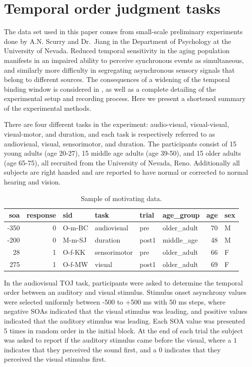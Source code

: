\documentclass[11pt, oneside, openany]{scrbook}
\begin{document}
\hypertarget{toj-task}{%
\section{Temporal order judgment tasks}\label{toj-task}}

The data set used in this paper comes from small-scale preliminary experiments done by A.N. Scurry and Dr.~Jiang in the Department of Psychology at the University of Nevada. Reduced temporal sensitivity in the aging population manifests in an impaired ability to perceive synchronous events as simultaneous, and similarly more difficulty in segregating asynchronous sensory signals that belong to different sources. The consequences of a widening of the temporal binding window is considered in \citet{scurry2019aging}, as well as a complete detailing of the experimental setup and recording process. Here we present a shortened summary of the experimental methods.

There are four different tasks in the experiment: audio-visual, visual-visual, visual-motor, and duration, and each task is respectively referred to as audiovisual, visual, sensorimotor, and duration. The participants consist of 15 young adults (age 20-27), 15 middle age adults (age 39-50), and 15 older adults (age 65-75), all recruited from the University of Nevada, Reno. Additionally all subjects are right handed and are reported to have normal or corrected to normal hearing and vision.

\begin{table}[!h]

\caption{\label{tab:ch020-multitask-data}Sample of motivating data.}
\centering
\begin{tabular}[t]{rrllllrl}
\toprule
soa & response & sid & task & trial & age\_group & age & sex\\
\midrule
-350 & 0 & O-m-BC & audiovisual & pre & older\_adult & 70 & M\\
-200 & 0 & M-m-SJ & duration & post1 & middle\_age & 48 & M\\
28 & 1 & O-f-KK & sensorimotor & pre & older\_adult & 66 & F\\
275 & 1 & O-f-MW & visual & post1 & older\_adult & 69 & F\\
\bottomrule
\end{tabular}
\end{table}

In the audiovisual TOJ task, participants were asked to determine the temporal order between an auditory and visual stimulus. Stimulus onset asynchrony values were selected uniformly between -500 to +500 ms with 50 ms steps, where negative SOAs indicated that the visual stimulus was leading, and positive values indicated that the auditory stimulus was leading. Each SOA value was presented 5 times in random order in the initial block. At the end of each trial the subject was asked to report if the auditory stimulus came before the visual, where a \(1\) indicates that they perceived the sound first, and a \(0\) indicates that they perceived the visual stimulus first.
\end{document}
